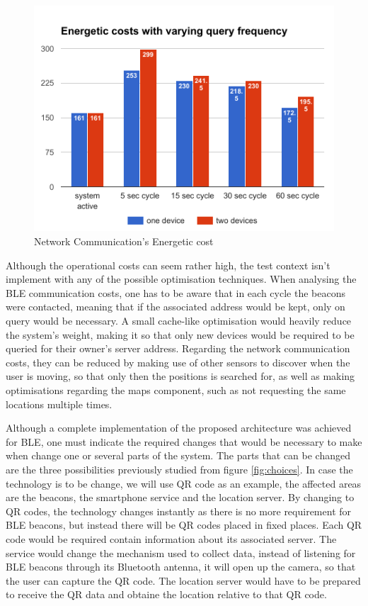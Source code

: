 \documentclass[a4paper]{IEEEtran}
\begin{document}
 
\begin{figure} 
\centering 
\includegraphics[width=1\linewidth]{figures/system-working.png} 
\caption[Network Communication's Energetic cost]{Network Communication's Energetic cost} 
\label{fig:commcosts} 
\end{figure} 
 
 
Although the operational costs can seem rather high, the test context isn't implement with any of the possible optimisation techniques. When analysing the BLE communication costs, one has to be aware that in each cycle the beacons were contacted, meaning that if the associated address would be kept, only on query would be necessary. A small cache-like optimisation would heavily reduce the system's weight, making it so that only new devices would be required to be queried for their owner's server address. Regarding the network communication costs, they can be reduced by making use of other sensors to discover when the user is moving, so that only then the positions is searched for, as well as making optimisations regarding the maps component, such as not requesting the same locations multiple times.  
 
 
 
 
Although a complete implementation of the proposed architecture was achieved for BLE, one must indicate the required changes that would be necessary to make when change one or several parts of the system. The parts that can be changed are the three possibilities previously studied from figure \ref{fig:choices}. In case the technology is to be change, we will use QR code as an example, the affected areas are the beacons, the smartphone service and the location server. By changing to QR codes, the technology changes instantly as there is no more requirement for BLE beacons, but instead there will be QR codes placed in fixed places. Each QR code would be required contain information about its associated server. The service would change the mechanism used to collect data, instead of listening for BLE beacons through its Bluetooth antenna, it will open up the camera, so that the user can capture the QR code. The location server would have to be prepared to receive the QR data and obtaine the location relative to that QR code. 
 
\end{document}
